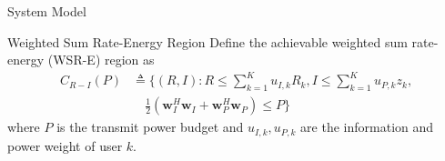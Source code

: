\documentclass{IEEEtran}
\begin{document}
\begin{section}{System Model}
	\begin{subsection}{Weighted Sum Rate-Energy Region}
		Define the achievable weighted sum rate-energy (WSR-E) region as
		\begin{equation}
			\begin{split}
				C_{R-I}(P)
				&\triangleq \biggl\{(R,I):R\le\sum_{k=1}^K{u_{I,k}R_k},I\le\sum_{k=1}^K u_{P,k}z_k,\\
				&\quad \frac{1}{2}({\boldsymbol{w}_I^H}{\boldsymbol{w}_I}+{\boldsymbol{w}_P^H}{\boldsymbol{w}_P}) \le P\biggr\}
			\end{split}
		\end{equation}
		where $P$ is the transmit power budget and $u_{I,k},u_{P,k}$ are the information and power weight of user $k$.
	\end{subsection}
\end{section}
\end{document}
